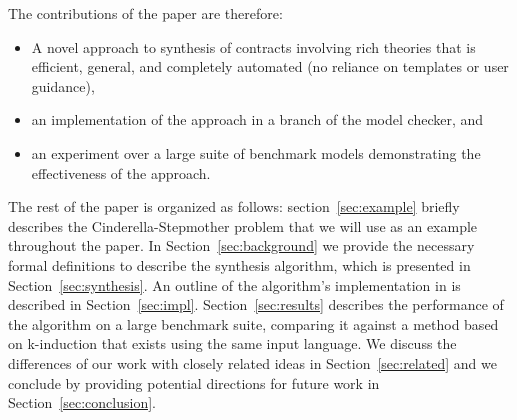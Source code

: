 The contributions of the paper are therefore:
\begin{itemize}
    \item A novel approach to synthesis of contracts involving rich theories that is efficient, general, and completely automated (no reliance on templates or user guidance),
    \item an implementation of the approach in a branch of the \jkind model checker, and
    \item an experiment over a large suite of benchmark models demonstrating the effectiveness of the approach.
\end{itemize}

The rest of the paper is organized as follows: section~\ref{sec:example} briefly describes the Cinderella-Stepmother problem that we will use as an example throughout the paper. In Section~\ref{sec:background} we provide the necessary formal definitions to describe the synthesis algorithm, which is presented in Section~\ref{sec:synthesis}.
An outline of the algorithm's implementation in \jkind is described in Section~\ref{sec:impl}. Section~\ref{sec:results} describes the performance of the algorithm on a large benchmark suite, comparing it against a method based on k-induction that exists using the same input language.  We discuss the differences of our work with closely related ideas in Section~\ref{sec:related} and we conclude by providing potential directions for future work in Section~\ref{sec:conclusion}.

	
